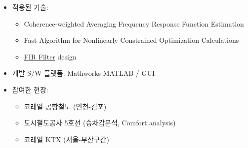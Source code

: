\documentclass[10pt,a4paper,ragged2e]{altacv}
\begin{document}
\begin{fullwidth}
\begin{itemize}
\begin{itemize}
  \item 공항철도 이상개소 분석시스템 : 10m KP간격 CWA-FRF\footnote{Coherence Weighted Averaged Frequency Response Function (CWA-FRF) refer to ``\href{http://institute.lanl.gov/ei/shm/pubs/modal_stat_jvc_jul00.pdf}{Estimation Of Statistical Distributions For Modal Parameters Identified From Averaged Frequency Response Function Data}'', Journal of Vibration and Control, July 2000} 함수로 전달함수 예측, 측정된 차축-대차-차체의 \href{https://en.wikipedia.org/wiki/Frequency_response}{주파수응답함수(Frequency response function, FRF)}를 통해 중심주파수-대역폭-가중치함수를 규정, \href{http://www.scholarpedia.org/article/Boundary_value_problem}{경계비선형} 최적화 알고리즘 적용으로 이상개소 분석시스템 구축 
  \item 공항철도 차량 주행 안정성 분석 시스템 : 병진, 롤링진동 분석 후 속도/도상 별 기준값 적용하여 이상진동의 위치 검출
  \item 공항철도/도시철도 승차감 분석 시스템 : \href{http://www.iso.org/iso/catalogue_detail.htm?csnumber=7612}{ISO 2631-1:1997}과 \href{http://www.uic.org/etf/codex/codex-detail.php?codeFiche=513\&langue_fiche=E}{UIC513}에서 제시한 방법으로 각각 필터제작 4채널 DAQ보드와 3축 가속도계 센서 적용 
  \item 공항철도 slip/slide : 타코미터의 펄스의 계측노이즈 정규화 제거하고 속도 수치미분으로 임계값으로 정성적으로 판단. 실제 주행거리와 slip/slide 개소와 그 거리는 대부분 일치함으로 확인.
  \item KTX 주행거동평가 알고리즘 : 국내에서 개발한 KTX산천, 각 분기기등 분석, \href{http://www.uic.org/etf/codex/codex-detail.php?langue_fiche=E\&codeFiche=518}{UIC-518OR} 기준에 따라 주행거동평가, 누적분포 활용해서 99.85\% 0.15\%의 피크 검출
\end{itemize}
\item 적용된 기술:
\begin{itemize}
  \item Coherence-weighted Averaging Frequency Response Function Estimation
  \item Fast Algorithm for Nonlinearly Constrained Optimization Calculations
  \item \href{https://en.wikipedia.org/wiki/Finite_impulse_response}{FIR Filter} design
\end{itemize}
\item 개발 S/W 플랫폼: Mathworks MATLAB / GUI
\item 참여한 현장:
\begin{itemize} 
  \item 코레일 공항철도 (인천-김포)
  \item 도시철도공사 5호선 (승차감분석, Comfort analysis)
  \item 코레일 KTX (서울-부산구간)
\end{itemize}
\end{itemize}


\end{fullwidth}
\end{document}
